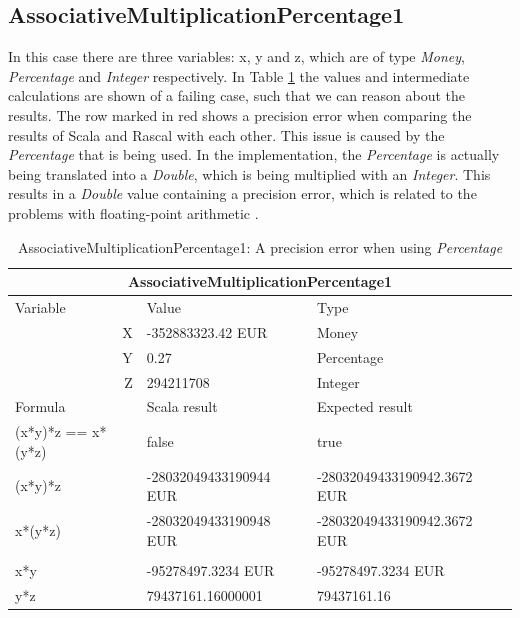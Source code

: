 \subsection{AssociativeMultiplicationPercentage1}
In this case there are three variables: x, y and z, which are of type \textit{Money}, \textit{Percentage} and \textit{Integer} respectively. In Table \ref{ch4_init_check_AssociativeMultiplicationPercentage1} the values and intermediate calculations are shown of a failing case, such that we can reason about the results. The row marked in red shows a precision error when comparing the results of Scala and Rascal with each other. This issue is caused by the \textit{Percentage} that is being used. In the implementation, the \textit{Percentage} is actually being translated into a \textit{Double}, which is being multiplied with an \textit{Integer}. This results in a \textit{Double} value containing a precision error, which is related to the problems with floating-point arithmetic \cite{goldberg1991every}.
\\
\begin{table}[h!]
\centering
\begin{tabular}{|lll|}
\hline
\multicolumn{3}{|c|}{AssociativeMultiplicationPercentage1}                    \\ \hline
Variable               & Value                  & Type                        \\
\multicolumn{1}{|r}{X} & -352883323.42 EUR      & Money                       \\
\multicolumn{1}{|r}{Y} & 0.27                   & Percentage                  \\
\multicolumn{1}{|r}{Z} & 294211708              & Integer                     \\ \hline
Formula                & Scala result           & Expected result             \\
(x*y)*z == x*(y*z)     & false                  & true                        \\
(x*y)*z                & -28032049433190944 EUR & -28032049433190942.3672 EUR \\
x*(y*z)                & -28032049433190948 EUR & -28032049433190942.3672 EUR \\
                       &                        &                             \\
x*y                    & -95278497.3234 EUR     & -95278497.3234 EUR          \\
y*z                    & 79437161.16000001      & 79437161.16                 \\ \hline
\end{tabular}
\caption{AssociativeMultiplicationPercentage1: A precision error when using \textit{Percentage}}
\label{ch4_init_check_AssociativeMultiplicationPercentage1}
\end{table}
